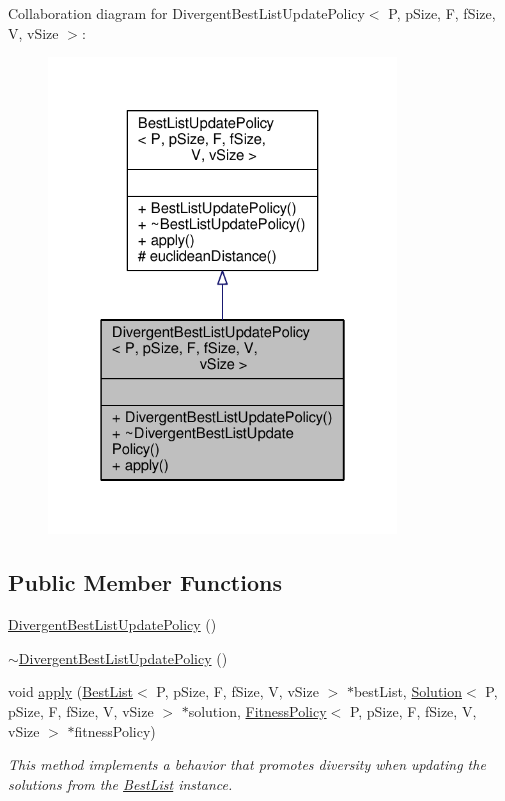 Collaboration diagram for Divergent\+Best\+List\+Update\+Policy$<$ P, p\+Size, F, f\+Size, V, v\+Size $>$\+:\nopagebreak
\begin{figure}[H]
\begin{center}
\leavevmode
\includegraphics[width=262pt]{classDivergentBestListUpdatePolicy__coll__graph}
\end{center}
\end{figure}
\subsection*{Public Member Functions}
\begin{DoxyCompactItemize}
\item 
\hyperlink{classDivergentBestListUpdatePolicy_a9f071374e5db075f1ce1e6cba1bfa1a1}{Divergent\+Best\+List\+Update\+Policy} ()
\item 
\hyperlink{classDivergentBestListUpdatePolicy_a8c0f47b6ca1693a298c170f73d1f2d21}{$\sim$\+Divergent\+Best\+List\+Update\+Policy} ()
\item 
void \hyperlink{classDivergentBestListUpdatePolicy_a793d47a0c458eef94b27fbee73e5df0e}{apply} (\hyperlink{classBestList}{Best\+List}$<$ P, p\+Size, F, f\+Size, V, v\+Size $>$ $\ast$best\+List, \hyperlink{classSolution}{Solution}$<$ P, p\+Size, F, f\+Size, V, v\+Size $>$ $\ast$solution, \hyperlink{classFitnessPolicy}{Fitness\+Policy}$<$ P, p\+Size, F, f\+Size, V, v\+Size $>$ $\ast$fitness\+Policy)
\begin{DoxyCompactList}\small\item\em This method implements a behavior that promotes diversity when updating the solutions from the \hyperlink{classBestList}{Best\+List} instance. \end{DoxyCompactList}\end{DoxyCompactItemize}
